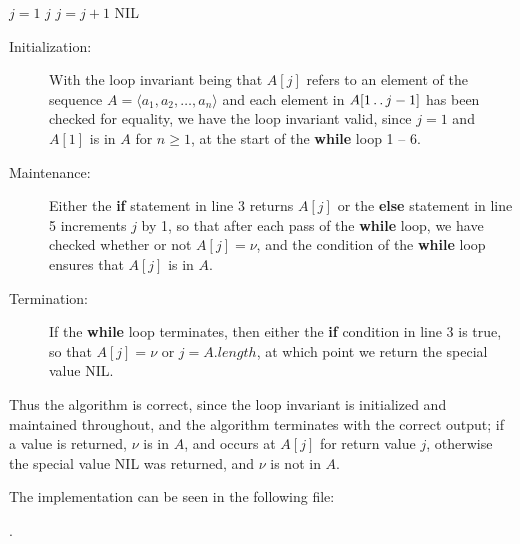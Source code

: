 
\begin{algorithmic}[1]
    \STATE $j = 1$
            \RETURN $j$
        \ELSE
            \STATE $j = j + 1$
        \ENDIF
    \ENDWHILE
    \RETURN \textrm{NIL}
\end{algorithmic}

\begin{description}
    \item[Initialization:] With the loop invariant being that $A[j]$ refers to an 
        element of the sequence $A = \langle a_1, a_2, \ldots, a_n \rangle$ and 
        each element in $A[1\mathinner{{\ldotp}\,{\ldotp}} j - 1]$ has been checked for equality, we 
        have the loop invariant valid, since $j = 1$ and $A[1]$ is in $A$ for 
        $n \ge 1$, at the start of the \textbf{while} loop 1 -- 6.
    \item[Maintenance:] Either the \textbf{if} statement in line 3 returns $A[j]$
        or the \textbf{else} statement in line 5 increments $j$ by 1, so that after
        each pass of the \textbf{while} loop, we have checked whether or not 
        $A[j] = \nu$, and the condition of the \textbf{while} loop ensures that 
        $A[j]$ is in $A$.
    \item[Termination:] If the \textbf{while} loop terminates, then either the 
        \textbf{if} condition in line 3 is true, so that $A[j] = \nu$ or 
        $j = A.\mathit{length}$, at which point we return the special value
        \textrm{NIL}.
\end{description}

Thus the algorithm is correct, since the loop invariant is initialized and 
maintained throughout, and the algorithm terminates with the correct output;
if a value is returned, $\nu$ is in $A$, and occurs at $A[j]$ for return value
$j$, otherwise the special value \textrm{NIL} was returned, and $\nu$ is not in $A$.

The implementation can be seen in the following file:

.

